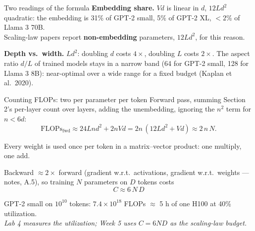 \documentclass[11pt,aspectratio=169]{beamer}
\newcommand{\dest}[1]{\textcolor{structure}{\textbf{#1}}}
\newcommand{\hook}[1]{{\small\textcolor{gray!60!black}{\textit{#1}}}}
\begin{document}
\begin{frame}{Two readings of the formula}
  \textbf{Embedding share.} $Vd$ is linear in $d$, $12Ld^2$ quadratic: the embedding is
  31\% of GPT-2 small, 5\% of GPT-2 XL, $<2\%$ of Llama 3 70B.\\
  Scaling-law papers report \dest{non-embedding} parameters, $12Ld^2$, for this reason.

  \vspace{1em}
  \textbf{Depth vs.\ width.} $Ld^2$: doubling $d$ costs $4\times$, doubling $L$ costs
  $2\times$. The aspect ratio $d/L$ of trained models stays in a narrow band
  (64 for GPT-2 small, 128 for Llama 3 8B): near-optimal over a wide range for a fixed
  budget (Kaplan et al.\ 2020).
\end{frame}

\begin{frame}{Counting FLOPs: two per parameter per token}
  Forward pass, summing Section 2's per-layer count over layers, adding the unembedding,
  ignoring the $n^2$ term for $n < 6d$:
  \[
    \text{FLOPs}_{\mathrm{fwd}} \approx 24Lnd^2 + 2nVd = 2n\,(12Ld^2 + Vd) \approx 2\,n\,N .
  \]

  \vspace{0.6em}
  Every weight is used once per token in a matrix--vector product: one multiply, one add.

  \vspace{0.8em}
  Backward $\approx 2\times$ forward (gradient w.r.t.\ activations, gradient w.r.t.\
  weights --- notes, A.5), so training $N$ parameters on $D$ tokens costs
  \[
    \boxed{\;C\approx 6\,N\,D\;}
  \]

  \vspace{0.4em}
  GPT-2 small on $10^{10}$ tokens: $7.4\times 10^{18}$ FLOPs $\approx$ 5 h of one H100 at
  40\% utilization.\\
  \hook{Lab 4 measures the utilization; Week 5 uses $C = 6ND$ as the scaling-law budget.}
\end{frame}
\end{document}
